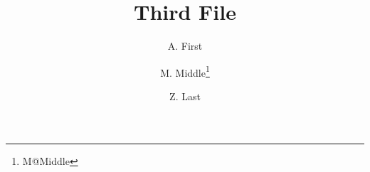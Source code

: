 \title{Third File}
\author[1]{A. First}
\author[1,2]{M. Middle\thanks{M@Middle}}
\author[2]{Z. Last}


